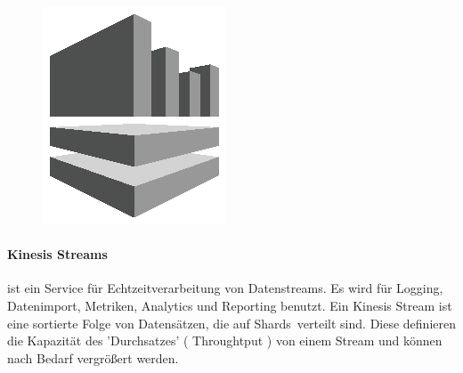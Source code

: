 \documentclass[
12pt,
english,
ngerman,
headsepline,
twoside,
openright,
numbers=noenddot,version=first
]{scrreprt}
\begin{document}
\begin{figure}
	\includegraphics[width=0.9\linewidth]{./pics/aws/Analytics_GRAYSCALE_AmazonKinesis.eps}
\end{figure}
\paragraph{Kinesis Streams} ist ein Service für Echtzeitverarbeitung von Datenstreams. Es wird für Logging, Datenimport, Metriken, Analytics und Reporting benutzt. Ein Kinesis Stream ist eine sortierte Folge von Datensätzen, die auf \glqq Shards\grqq\ verteilt sind. Diese definieren die Kapazität des 'Durchsatzes' ( Throughtput ) von einem Stream und können nach Bedarf vergrößert werden.
\end{document}
